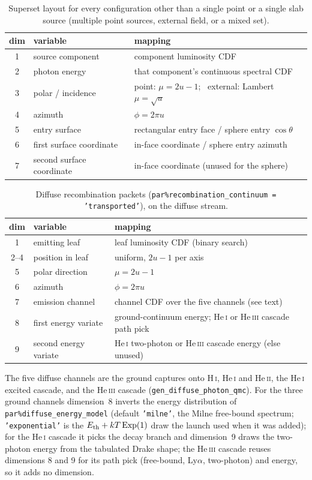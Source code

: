 \documentclass[english,a4paper]{my_memo}
\newcommand{\code}[1]{\texttt{#1}}
\begin{document}
\begin{table}[htbp]
\centering
\small
\caption{Superset layout for every configuration other than a single point
or a single slab source (multiple point sources, external field, or a mixed
set).}
\label{tab:dim7}
\begin{tabular}{cll}
\toprule
dim & variable & mapping \\
\midrule
1 & source component & component luminosity CDF \\
2 & photon energy & that component's continuous spectral CDF \\
3 & polar / incidence & point: $\mu = 2u-1$; \ external: Lambert $\mu = \sqrt{u}$ \\
4 & azimuth & $\phi = 2\pi u$ \\
5 & entry surface & rectangular entry face / sphere entry $\cos\theta$ \\
6 & first surface coordinate & in-face coordinate / sphere entry azimuth \\
7 & second surface coordinate & in-face coordinate (unused for the sphere) \\
\bottomrule
\end{tabular}
\end{table}

\begin{table}[htbp]
\centering
\small
\caption{Diffuse recombination packets (\code{par\%recombination\_continuum = 'transported'}), on the
diffuse stream.}
\label{tab:dim9}
\begin{tabular}{cll}
\toprule
dim & variable & mapping \\
\midrule
1 & emitting leaf & leaf luminosity CDF (binary search) \\
2--4 & position in leaf & uniform, $2u-1$ per axis \\
5 & polar direction & $\mu = 2u-1$ \\
6 & azimuth & $\phi = 2\pi u$ \\
7 & emission channel & channel CDF over the five channels (see text) \\
8 & first energy variate & ground-continuum energy; He\,\textsc{i} or He\,\textsc{iii} cascade path pick \\
9 & second energy variate & He\,\textsc{i} two-photon or He\,\textsc{iii} cascade energy (else unused) \\
\bottomrule
\end{tabular}
\end{table}

The five diffuse channels are the ground captures onto H\,\textsc{i},
He\,\textsc{i} and He\,\textsc{ii}, the He\,\textsc{i} excited cascade, and the
He\,\textsc{iii} cascade (\code{gen\_diffuse\_photon\_qmc}).  For the three
ground channels dimension~8 inverts the energy distribution of
\code{par\%diffuse\_energy\_model} (default \code{'milne'}, the Milne
free-bound spectrum; \code{'exponential'} is the $E_{\rm th} + kT\,{\rm
Exp}(1)$ draw the launch used when it was added); for the He\,\textsc{i}
cascade it picks the decay branch and dimension~9 draws the two-photon energy
from the tabulated Drake shape; the He\,\textsc{iii} cascade reuses dimensions
8 and 9 for its path pick (free-bound, Ly$\alpha$, two-photon) and energy, so it
adds no dimension.
\end{document}
